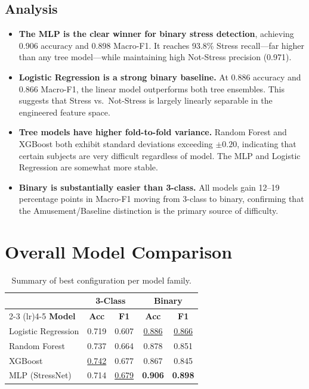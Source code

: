 \documentclass[11pt]{article}
\begin{document}
\subsection{Analysis}

\begin{itemize}
    \item \textbf{The MLP is the clear winner for binary stress detection}, achieving 0.906 accuracy and 0.898 Macro-F1.
    It reaches 93.8\% Stress recall---far higher than any tree model---while maintaining high Not-Stress precision (0.971).

    \item \textbf{Logistic Regression is a strong binary baseline.}
    At 0.886 accuracy and 0.866 Macro-F1, the linear model outperforms both tree ensembles.
    This suggests that Stress vs.\ Not-Stress is largely linearly separable in the engineered feature space.

    \item \textbf{Tree models have higher fold-to-fold variance.}
    Random Forest and XGBoost both exhibit standard deviations exceeding $\pm 0.20$, indicating that certain subjects are very difficult regardless of model.
    The MLP and Logistic Regression are somewhat more stable.

    \item \textbf{Binary is substantially easier than 3-class.}
    All models gain 12--19 percentage points in Macro-F1 moving from 3-class to binary, confirming that the Amusement/Baseline distinction is the primary source of difficulty.
\end{itemize}


\section{Overall Model Comparison}
\label{sec:comparison}

\begin{table}[H]
\centering
\caption{Summary of best configuration per model family.}
\label{tab:summary}
\begin{tabular}{lcccc}
\toprule
 & \multicolumn{2}{c}{\textbf{3-Class}} & \multicolumn{2}{c}{\textbf{Binary}} \\
\cmidrule(lr){2-3} \cmidrule(lr){4-5}
\textbf{Model} & \textbf{Acc} & \textbf{F1} & \textbf{Acc} & \textbf{F1} \\
\midrule
Logistic Regression & 0.719 & 0.607 & \underline{0.886} & \underline{0.866} \\
Random Forest       & 0.737 & 0.664 & 0.878 & 0.851 \\
XGBoost             & \underline{0.742} & 0.677 & 0.867 & 0.845 \\
MLP (StressNet)     & 0.714 & \underline{0.679} & \textbf{0.906} & \textbf{0.898} \\
\bottomrule
\end{tabular}
\end{table}
\end{document}
